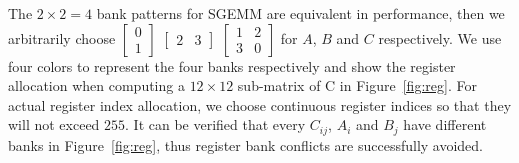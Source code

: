 The $2\times2=4$ bank patterns for SGEMM are equivalent in performance, then we arbitrarily
choose $\begin{bmatrix} 0 \\ 1  \end{bmatrix}$ $\begin{bmatrix} 2 & 3 \end{bmatrix}$
    $\begin{bmatrix} 1 & 2 \\ 3 & 0  \end{bmatrix}$ for $A$, $B$ and $C$ respectively.
We use four colors to represent the four banks respectively and show the register allocation when computing a $12 \times 12$ sub-matrix of C in Figure~\ref{fig:reg}.
For actual register index allocation, we choose continuous register indices so that they will not exceed $255$.
It can be verified that every $C_{ij}$, $A_i$ and $B_j$ have different banks in Figure~\ref{fig:reg}, thus register bank conflicts are successfully avoided.
